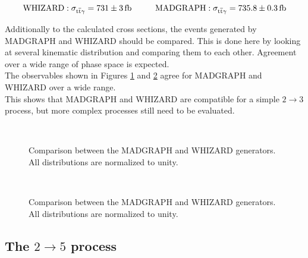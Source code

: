 \begin{equation}
\mathrm{WHIZARD: }\; \sigma_{\ttgamma} = \SI{731 \pm 3}{\femto \barn} \hspace{1.cm} \mathrm{MADGRAPH: }\;  \sigma_{\ttgamma} = \SI{735.8 \pm 0.3}{\femto \barn}
\label{eq_simu_2to3_cross}
\end{equation}

Additionally to the calculated cross sections, the events generated by MADGRAPH and WHIZARD should be compared. This is done here by looking  at several kinematic distribution and comparing them to each other. Agreement over a wide range of phase space is expected. \\
The observables shown in Figures \ref{fig_simu_comp_2to3_1} and \ref{fig_simu_comp_2to3_2} agree for MADGRAPH and WHIZARD over a wide range.\\
This shows that MADGRAPH and WHIZARD are compatible for a simple $2 \to 3$ process, but more complex processes still need to be evaluated.

\begin{figure}
  \\
  \caption{Comparison between the MADGRAPH and WHIZARD generators. All distributions are normalized to unity.}
  \label{fig_simu_comp_2to3_1}
\end{figure}

\begin{figure}
  \\
  \caption{Comparison between the MADGRAPH and WHIZARD generators. All distributions are normalized to unity.}
  \label{fig_simu_comp_2to3_2}
\end{figure}


\subsection{The $2 \to 5$ process}

